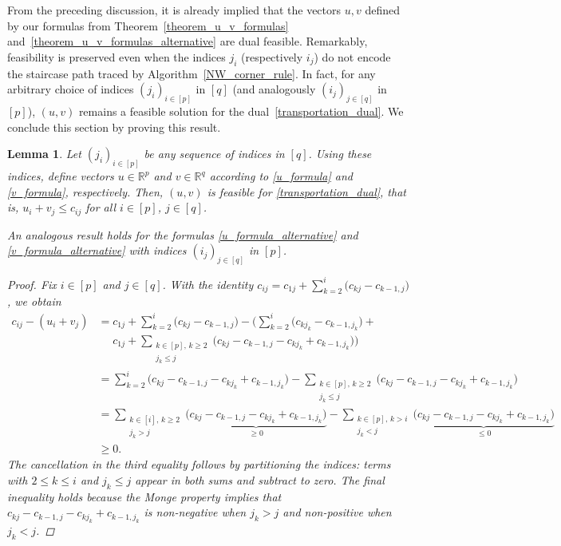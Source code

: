 \documentclass[letterpaper]{article}
\newtheorem{lemma}[theorem]{Lemma}
\begin{document}
From the preceding discussion, it is already implied that the vectors $u, v$ defined by our formulas from Theorem~\ref{theorem_u_v_formulas} and~\ref{theorem_u_v_formulas_alternative} are dual feasible. Remarkably, feasibility is preserved even when the indices $j_i$ (respectively $i_j$) do not encode the staircase path traced by Algorithm~\ref{NW_corner_rule}. In fact, for any arbitrary choice of indices $(j_i)_{i \in [p]}$ in $[q]$ (and analogously $(i_j)_{j \in [q]}$ in $[p]$), $(u, v)$ remains a feasible solution for the dual~\eqref{transportation_dual}. We conclude this section by proving this result.

\begin{lemma}\label{u_v_dual_feasibility}
    Let $(j_i)_{i \in [p]}$ be any sequence of indices in $[q]$. Using these indices, define vectors $u \in \mathbb{R}^p$ and $v \in \mathbb{R}^q$ according to \eqref{u_formula} and \eqref{v_formula}, respectively. Then, $(u, v)$ is feasible for \eqref{transportation_dual}, that is, $u_i + v_j \leq c_{ij}$ for all $i \in [p]$, $j \in [q]$.
    
    \noindent An analogous result holds for the formulas \eqref{u_formula_alternative} and \eqref{v_formula_alternative} with indices $(i_j)_{j \in [q]}$ in $[p]$.
    
    \begin{proof}
        Fix $i \in [p]$ and $j \in [q]$. With the identity $c_{ij} = c_{1j} + \sum_{k=2}^{i} \bigl( c_{k j} - c_{k-1, j} \bigr)$, we obtain
        {\allowdisplaybreaks
        \begin{align*}
            c_{ij} - (u_i + v_j) &= c_{1j} + \sum_{k=2}^{i} \bigl( c_{k j} - c_{k-1, j} \bigr) - \Biggl( \sum_{k=2}^{i} \bigl( c_{k j_k} - c_{k-1, j_k} \bigr) +\\
            &\phantom{=} c_{1j} + \sum_{\substack{k \in [p], \, k \geq 2 \\ j_k \leq j}} \bigl( c_{kj} - c_{k-1, j} - c_{k j_k} + c_{k-1, j_k} \bigr) \Biggr) \\
            &= \sum_{k=2}^{i} \bigl( c_{k j} - c_{k-1, j} - c_{k j_k} + c_{k-1, j_k} \bigr) - \sum_{\substack{k \in [p], \, k \geq 2 \\ j_k \leq j}} \bigl( c_{kj} - c_{k-1, j} - c_{k j_k} + c_{k-1, j_k} \bigr) \\
            &= \sum_{\substack{k \in [i], \, k \geq 2 \\ j_k > j}} \underbrace{\bigl( c_{k j} - c_{k-1, j} - c_{k j_k} + c_{k-1, j_k} \bigr)}_{\geq 0} - \sum_{\substack{k \in [p], \, k > i \\ j_k < j}} \underbrace{\bigl( c_{kj} - c_{k-1, j} - c_{k j_k} + c_{k-1, j_k} \bigr)}_{\leq 0} \\
            &\geq 0.
        \end{align*}
        }
        The cancellation in the third equality follows by partitioning the indices: terms with $2 \leq k \leq i$ and $j_k \leq j$ appear in both sums and subtract to zero. The final inequality holds because the Monge property implies that $c_{kj} - c_{k-1, j} - c_{k j_k} + c_{k-1, j_k}$ is non-negative when $j_k > j$ and non-positive when $j_k < j$.
    \end{proof}
\end{lemma}
\end{document}
